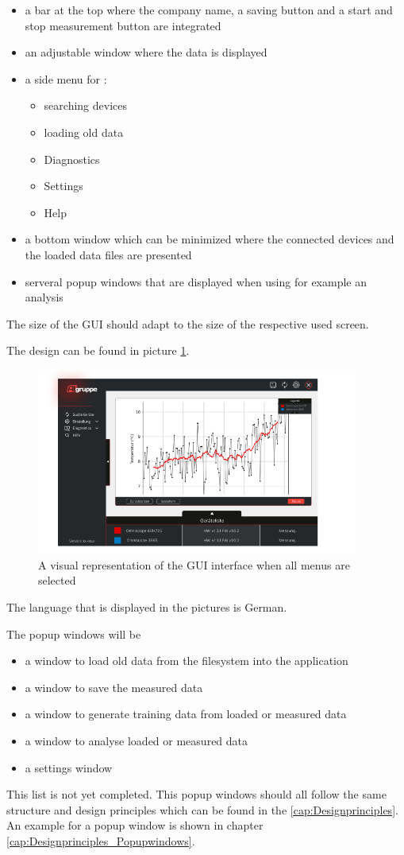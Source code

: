\documentclass[]{scrreprt}
\begin{document}
\begin{itemize}
    \item a bar at the top where the company name, a saving button and a start and stop measurement button are integrated 
    \item an adjustable window where the data is displayed
    \item a side menu for : 
    \begin{itemize}
        \item searching devices 
        \item loading old data 
        \item Diagnostics
        \item Settings
        \item Help
    \end{itemize}
    \item a bottom window which can be minimized where the connected devices and the loaded data files are presented 
    \item serveral popup windows that are displayed when using for example an analysis
\end{itemize}

The size of the GUI should adapt to the size of the respective used screen.

The design can be found in picture \ref{fig: GUI}. 
\begin{figure}[!h]
    \includegraphics[width= 400px]{assets/pictures/DatawindowVersion1.0.png}
    \caption[]{A visual representation of the GUI interface when all menus are selected}
    \label{fig: GUI}
\end{figure}
The language that is displayed in the pictures is German.  


The popup windows will be 
\begin{itemize}
    \item a window to load old data from the filesystem into the application
    \item a window to save the measured data 
    \item a window to generate training data from loaded or measured data
    \item a window to analyse loaded or measured data 
    \item a settings window 
\end{itemize}
This list is not yet completed. 
This popup windows should all follow the same structure and design principles which can be found in the \ref{cap:Designprinciples}. 
An example for a popup window is shown in chapter \ref{cap:Designprinciples_Popupwindows}.
\end{document}
